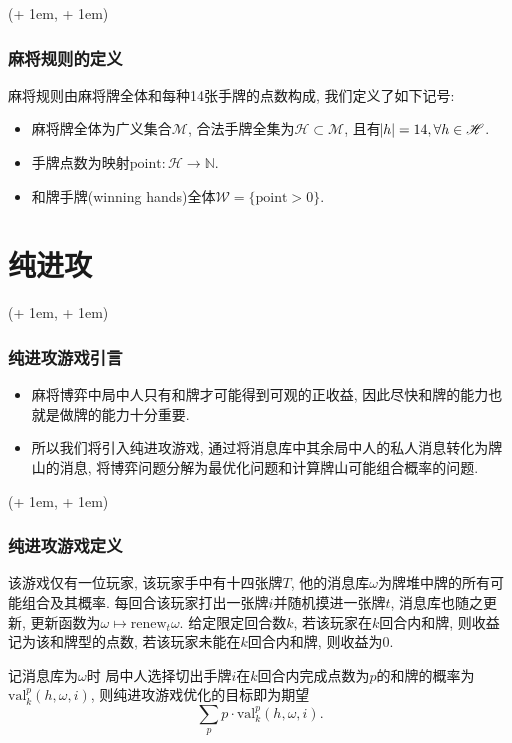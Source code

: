 \documentclass[xcolor=dvipsnames]{ctexbeamer}
\newcommand{\FrameTextSE}[1]{
    \begin{textblock*}{\paperwidth}(\textwidth + 1em, \textheight + 1em)
        #1
    \end{textblock*}
}
\newcommand{\mahjong}{\mathscr{M}}
\newcommand{\point}{\mathrm{point}}
\newcommand{\Hand}{\mathscr{H}}
\newcommand{\hand}{h}
\newcommand{\base}{\omega}
\let\oldframe\frame
\let\oldendframe\endframe
\renewenvironment{frame}
    {\oldframe\FrameTextSE{\small\color{blue}{\crono}}}
    {\oldendframe}
\begin{document}
    \begin{frame}
        \frametitle{麻将规则的定义}
        \begin{definition}[麻将规则]
            麻将规则由麻将牌全体和每种14张手牌的点数构成, 我们定义了如下记号:
            \begin{itemize}
                \item 麻将牌全体为广义集合$\mahjong$,
                    合法手牌全集为$\Hand\subset\mahjong$,
                    且有$\abs{\hand}=14, \forall{\hand\in\Hand}$.
                \item 手牌点数为映射$\point: \Hand\rightarrow\mathbb{N}$.
                \item 和牌手牌(winning hands)全体$\mathscr{W}=\{\point>0\}$.
            \end{itemize}
        \end{definition}
    \end{frame}

    \section{纯进攻}

    \begin{frame}
        \frametitle{纯进攻游戏引言}
        \begin{itemize}
            \item 麻将博弈中局中人只有和牌才可能得到可观的正收益,
                因此尽快和牌的能力也就是做牌的能力十分重要.
            \item 所以我们将引入纯进攻游戏,
                通过将消息库中其余局中人的私人消息转化为牌山的消息,
                将博弈问题分解为最优化问题和计算牌山可能组合概率的问题.
        \end{itemize}
    \end{frame}

    \begin{frame}
        \frametitle{纯进攻游戏定义}
        \begin{definition}[纯进攻游戏]
            该游戏仅有一位玩家, 该玩家手中有十四张牌$T$,
            他的消息库$\base$为牌堆中牌的所有可能组合及其概率.
            每回合该玩家打出一张牌$i$并随机摸进一张牌$t$, 消息库也随之更新,
            更新函数为$\base\mapsto\mathrm{renew}_t{\base}$.
            给定限定回合数$k$,
            若该玩家在$k$回合内和牌, 则收益记为该和牌型的点数,
            若该玩家未能在$k$回合内和牌, 则收益为0.
        \end{definition}
        记消息库为$\base$时
        局中人选择切出手牌$i$在$k$回合内完成点数为$p$的和牌的概率为
        $\mathrm{val}_{k}^{p}(\hand, \base, i)$,
        则纯进攻游戏优化的目标即为期望
        \[\sum_{p}{p\cdot\mathrm{val}_{k}^{p}(\hand, \base, i)}.\]
    \end{frame}
\end{document}
